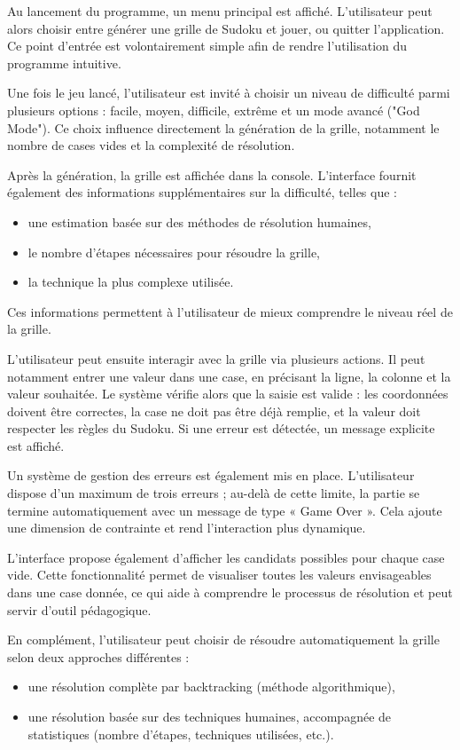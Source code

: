 \documentclass[a4paper]{article}
\begin{document}
Au lancement du programme, un menu principal est affiché. L’utilisateur peut alors choisir entre générer une grille de Sudoku et jouer, ou quitter l’application. Ce point d’entrée est volontairement simple afin de rendre l’utilisation du programme intuitive.

Une fois le jeu lancé, l’utilisateur est invité à choisir un niveau de difficulté parmi plusieurs options : facile, moyen, difficile, extrême et un mode avancé ("God Mode"). Ce choix influence directement la génération de la grille, notamment le nombre de cases vides et la complexité de résolution.

Après la génération, la grille est affichée dans la console. L’interface fournit également des informations supplémentaires sur la difficulté, telles que :
\begin{itemize}
    \item une estimation basée sur des méthodes de résolution humaines,
    \item le nombre d’étapes nécessaires pour résoudre la grille,
    \item la technique la plus complexe utilisée.
\end{itemize}

Ces informations permettent à l’utilisateur de mieux comprendre le niveau réel de la grille.

L’utilisateur peut ensuite interagir avec la grille via plusieurs actions. Il peut notamment entrer une valeur dans une case, en précisant la ligne, la colonne et la valeur souhaitée. Le système vérifie alors que la saisie est valide : les coordonnées doivent être correctes, la case ne doit pas être déjà remplie, et la valeur doit respecter les règles du Sudoku. Si une erreur est détectée, un message explicite est affiché.

Un système de gestion des erreurs est également mis en place. L’utilisateur dispose d’un maximum de trois erreurs ; au-delà de cette limite, la partie se termine automatiquement avec un message de type « Game Over ». Cela ajoute une dimension de contrainte et rend l’interaction plus dynamique.

L’interface propose également d’afficher les candidats possibles pour chaque case vide. Cette fonctionnalité permet de visualiser toutes les valeurs envisageables dans une case donnée, ce qui aide à comprendre le processus de résolution et peut servir d’outil pédagogique.

En complément, l’utilisateur peut choisir de résoudre automatiquement la grille selon deux approches différentes :
\begin{itemize}
    \item une résolution complète par backtracking (méthode algorithmique),
    \item une résolution basée sur des techniques humaines, accompagnée de statistiques (nombre d’étapes, techniques utilisées, etc.).
\end{itemize}
\end{document}

